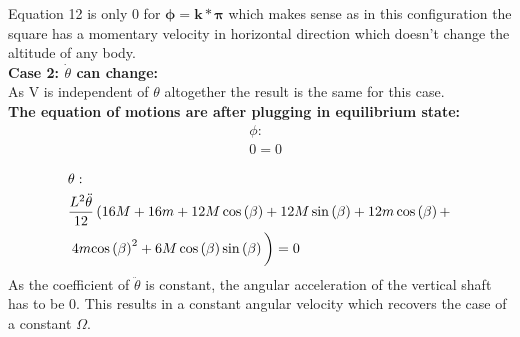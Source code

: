 \noindent Equation 12 is only 0 for $\boldsymbol{\phi = k*\pi}$ which makes sense as in this configuration the square has a momentary velocity in horizontal direction which doesn't change the altitude of any body.\vspace{0.5cm}\\

\textbf{Case 2: $\dot\theta$ can change:} \vspace{0.3cm}\\

As V is independent of $\theta$ altogether the result is the same for this case.\vspace{3mm}\\

\noindent \textbf{The equation of motions are after plugging in equilibrium state:}\vspace{3mm}\\


\begin{equation}
    \begin{split}
        &\phi:\\
        &0 = 0
    \end{split}
\end{equation}

\begin{equation}
    \begin{split}
        &\theta:\\
        &\frac{L^2\mathrm{\ddot\theta}}{12}\left(16M+16m+12M\cos\left(\beta \right)+12M\sin\left(\beta \right)+12m\cos\left(\beta \right)+\right.\\
        &\left.4m{\cos\left(\beta \right)}^2+6M\cos\left(\beta \right)\sin\left(\beta \right)\vphantom{\int_1^2}\right) = 0
    \end{split}
\end{equation}
As the coefficient of $\ddot\theta$ is constant, the angular acceleration of the vertical shaft has to be 0. This results in a constant angular velocity which recovers the case of a constant $\Omega$.


    



